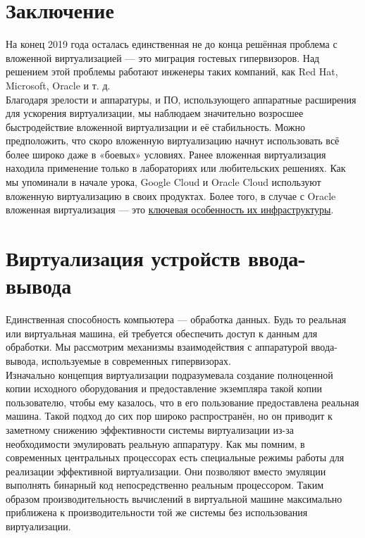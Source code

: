 \documentclass[14pt, a4paper]{article}
\begin{document}
\section*{Заключение}

На конец 2019 года осталась единственная не до конца решённая проблема с вложенной
виртуализацией — это миграция гостевых гипервизоров. Над решением этой проблемы работают
инженеры таких компаний, как Red Hat, Microsoft, Oracle и т. д.\\

Благодаря зрелости и аппаратуры, и ПО, использующего аппаратные расширения для ускорения
виртуализации, мы наблюдаем значительно возросшее быстродействие вложенной виртуализации и
её стабильность. Можно предположить, что скоро вложенную виртуализацию начнут использовать всё
более широко даже в «боевых» условиях. Ранее вложенная виртуализация находила применение
только в лабораториях или любительских решениях. Как мы упоминали в начале урока, Google Cloud
и Oracle Cloud используют вложенную виртуализацию в своих продуктах. Более того, в случае с Oracle
вложенная виртуализация — это \href{https://blogs.oracle.com/}{ключевая особенность их инфраструктуры}.

\section*{Виртуализация устройств ввода-вывода}

Единственная способность компьютера — обработка данных. Будь то реальная или виртуальная
машина, ей требуется обеспечить доступ к данным для обработки. Мы рассмотрим механизмы
взаимодействия с аппаратурой ввода-вывода, используемые в современных гипервизорах.\\

Изначально концепция виртуализации подразумевала создание полноценной копии исходного
оборудования и предоставление экземпляра такой копии пользователю, чтобы ему казалось, что в его
пользование предоставлена реальная машина. Такой подход до сих пор широко распространён, но он
приводит к заметному снижению эффективности системы виртуализации из-за необходимости
эмулировать реальную аппаратуру. Как мы помним, в современных центральных процессорах есть
специальные режимы работы для реализации эффективной виртуализации. Они позволяют вместо
эмуляции выполнять бинарный код непосредственно реальным процессором. Таким образом
производительность вычислений в виртуальной машине максимально приближена к
производительности той же системы без использования виртуализации.\\
\end{document}
